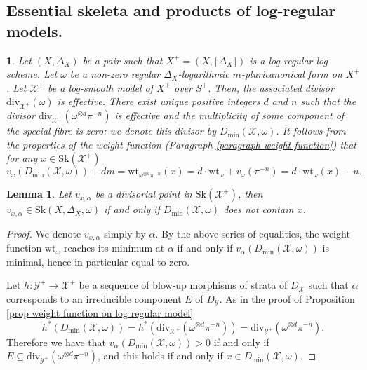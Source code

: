 \documentclass{amsart}%
\numberwithin{equation}{subsection}
\theoremstyle{plain2}
\newtheorem{lemma}[equation]{Lemma}
\theoremstyle{definition2}
\theoremstyle{stepstyle}
\theoremstyle{point}
\theoremstyle{subpoint}
\newtheorem{subpoint}[equation]{}%
\newcommand{\spa}[1]{\begin{subpoint}#1\end{subpoint}}           %
\newcommand{\cX}{\ensuremath{\mathscr{X}}}
\newcommand{\cY}{\ensuremath{\mathscr{Y}}}
\renewcommand{\cY}{\ensuremath{\mathscr{Y}}}
\newcommand{\divisor}{\mathrm{div}}
\newcommand{\weight}{\mathrm{wt}}
\newcommand{\Sk}{\mathrm{Sk}}
\begin{document}
\subsection{Essential skeleta and products of log-regular models.}
\spa{Let $(X,\Delta_X)$ be a pair such that $X^+=(X,\lceil \Delta_X \rceil)$ is a log-regular log scheme. Let $\omega$ be a non-zero regular $\Delta_X$-logarithmic $m$-pluricanonical form on $X^+$. Let $\cX^+$ be a log-smooth model of $X^+$ over $S^+$. Then, the associated divisor $\divisor_{\cX^+}(\omega)$ is effective. There exist unique positive integers $d$ and $n$ such that the divisor $\divisor_{\cX^+}(\omega^{\otimes d} \pi^{-n})$ is effective and the multiplicity of some component of the special fibre is zero: we denote this divisor by $D_{\min}(\cX,\omega)$. It follows from the properties of the weight function (Paragraph \ref{paragraph weight function}) that for any $x \in \Sk(\cX^+)$ $$v_x(D_{\min}(\cX,\omega)) + dm = \weight_{\omega^{\otimes d}\pi^{-n}}(x)= d \cdot \weight_{\omega} + v_x(\pi^{-n}) = d \cdot \weight_{\omega}(x) -n.$$
}
\begin{lemma} \label{lemma characterization minimal points}
Let $v_{x,\alpha}$ be a divisorial point in $\Sk(\cX^+)$, then $v_{x,\alpha} \in \Sk(X,\Delta_X, \omega)$ if and only if $D_{\min}(\cX,\omega)$ does not contain $x$.
\end{lemma}
\begin{proof}
We denote $v_{x,\alpha}$ simply by $\alpha$. By the above series of equalities, the weight function $\weight_{\omega}$ reaches its minimum at $\alpha$ if and only if $v_\alpha(D_{\min}(\cX,\omega))$ is minimal, hence in particular equal to zero.

Let $h: \cY^+ \rightarrow \cX^+$ be a sequence of blow-up morphisms of strata of $D_\cX$ such that $\alpha$ corresponds to an irreducible component $E$ of $D_\cY$. As in the proof of Proposition \ref{prop weight function on log regular model} $$h^*(D_{\min}(\cX,\omega))=h^*(\divisor_{\cX^+} (\omega^{\otimes d} \pi^{-n}))= \divisor_{\cY^+} (\omega^{\otimes d} \pi^{-n}).$$ Therefore we have that $v_\alpha(D_{\min}(\cX,\omega)) >0$ if and only if $E \subseteq \divisor_{\cY^+} (\omega^{\otimes d} \pi^{-n})$, and this holds if and only if $x \in D_{\min}(\cX,\omega)$.
\end{proof}
\end{document}
